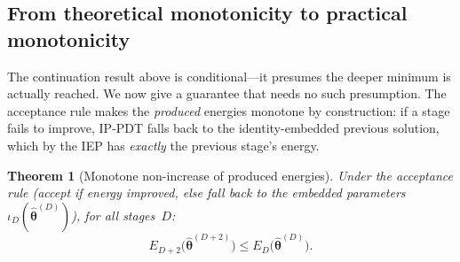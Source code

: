 \documentclass[11pt]{article}
\newtheorem{theorem}{Theorem}[section]
\theoremstyle{plain}
\theoremstyle{plain}
\begin{document}
\subsection{From theoretical monotonicity to practical monotonicity}
\label{sec:practical_mono}
The continuation result above is conditional---it presumes the deeper
minimum is actually reached.  We now give a guarantee that needs no such
presumption.  The acceptance rule makes the \emph{produced} energies
monotone by construction: if a stage fails to improve, IP-PDT falls back
to the identity-embedded previous solution, which by the IEP has
\emph{exactly} the previous stage's energy.
\begin{theorem}[Monotone non-increase of produced energies]
\label{thm:monotone}
  Under the acceptance rule (accept if energy improved, else fall back
  to the embedded parameters $\iota_D(\hat{\bm\theta}^{(D)})$), for
  all stages~$D$:
  \begin{equation}\label{eq:monotone_iter}
    E_{D+2}\bigl(\hat{\bm\theta}^{(D+2)}\bigr)
    \le E_D\bigl(\hat{\bm\theta}^{(D)}\bigr).
  \end{equation}
\end{theorem}
\end{document}
